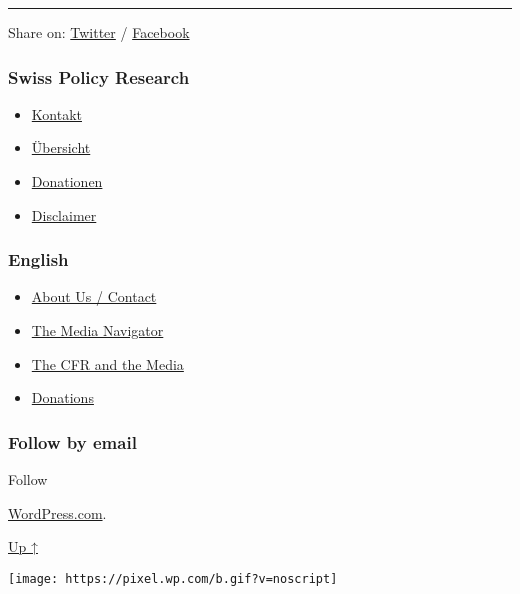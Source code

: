 \begin{center}\rule{0.5\linewidth}{\linethickness}\end{center}

Share on:
\href{https://twitter.com/intent/tweet?url=https://swprs.org/corona-media-propaganda/}{Twitter}
/
\href{https://www.facebook.com/share.php?u=https://swprs.org/corona-media-propaganda/}{Facebook}

\hypertarget{swiss-policy-research}{%
\subsubsection{Swiss Policy Research}\label{swiss-policy-research}}

\begin{itemize}
\tightlist
\item
  \href{https://swprs.org/kontakt/}{Kontakt}
\item
  \href{https://swprs.org/uebersicht/}{Übersicht}
\item
  \href{https://swprs.org/donationen/}{Donationen}
\item
  \href{https://swprs.org/disclaimer/}{Disclaimer}
\end{itemize}

\hypertarget{english}{%
\subsubsection{English}\label{english}}

\begin{itemize}
\tightlist
\item
  \href{https://swprs.org/contact/}{About Us / Contact}
\item
  \href{https://swprs.org/media-navigator/}{The Media Navigator}
\item
  \href{https://swprs.org/the-american-empire-and-its-media/}{The CFR
  and the Media}
\item
  \href{https://swprs.org/donations/}{Donations}
\end{itemize}

\hypertarget{follow-by-email}{%
\subsubsection{Follow by email}\label{follow-by-email}}

Follow

\href{https://wordpress.com/?ref=footer_custom_com}{WordPress.com}.

\protect\hyperlink{}{Up ↑}

\texttt{[image: https://pixel.wp.com/b.gif?v=noscript]}
